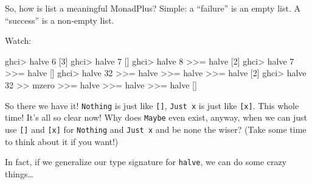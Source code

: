 \documentclass[]{article}
\newenvironment{Shaded}{}{}
\newcommand{\CommentTok}[1]{\textcolor[rgb]{0.38,0.63,0.69}{\textit{#1}}}
\newcommand{\DataTypeTok}[1]{\textcolor[rgb]{0.56,0.13,0.00}{#1}}
\newcommand{\DecValTok}[1]{\textcolor[rgb]{0.25,0.63,0.44}{#1}}
\newcommand{\FunctionTok}[1]{\textcolor[rgb]{0.02,0.16,0.49}{#1}}
\newcommand{\KeywordTok}[1]{\textcolor[rgb]{0.00,0.44,0.13}{\textbf{#1}}}
\newcommand{\NormalTok}[1]{#1}
\newcommand{\OperatorTok}[1]{\textcolor[rgb]{0.40,0.40,0.40}{#1}}
\newcommand{\OtherTok}[1]{\textcolor[rgb]{0.00,0.44,0.13}{#1}}
\begin{document}
So, how is list a meaningful MonadPlus? Simple: a ``failure'' is an empty list.
A ``success'' is a non-empty list.

Watch:

\begin{Shaded}
\begin{Highlighting}[]
\NormalTok{ghci}\OperatorTok{\textgreater{}}\NormalTok{ halve\textquotesingle{} }\DecValTok{6}
\NormalTok{[}\DecValTok{3}\NormalTok{]}
\NormalTok{ghci}\OperatorTok{\textgreater{}}\NormalTok{ halve\textquotesingle{} }\DecValTok{7}
\NormalTok{[]}
\NormalTok{ghci}\OperatorTok{\textgreater{}}\NormalTok{ halve\textquotesingle{} }\DecValTok{8} \OperatorTok{\textgreater{}\textgreater{}=}\NormalTok{ halve\textquotesingle{}}
\NormalTok{[}\DecValTok{2}\NormalTok{]}
\NormalTok{ghci}\OperatorTok{\textgreater{}}\NormalTok{ halve\textquotesingle{} }\DecValTok{7} \OperatorTok{\textgreater{}\textgreater{}=}\NormalTok{ halve\textquotesingle{}}
\NormalTok{[]}
\NormalTok{ghci}\OperatorTok{\textgreater{}}\NormalTok{ halve\textquotesingle{} }\DecValTok{32} \OperatorTok{\textgreater{}\textgreater{}=}\NormalTok{ halve\textquotesingle{} }\OperatorTok{\textgreater{}\textgreater{}=}\NormalTok{ halve\textquotesingle{} }\OperatorTok{\textgreater{}\textgreater{}=}\NormalTok{ halve\textquotesingle{}}
\NormalTok{[}\DecValTok{2}\NormalTok{]}
\NormalTok{ghci}\OperatorTok{\textgreater{}}\NormalTok{ halve\textquotesingle{} }\DecValTok{32} \OperatorTok{\textgreater{}\textgreater{}}\NormalTok{ mzero }\OperatorTok{\textgreater{}\textgreater{}=}\NormalTok{ halve\textquotesingle{} }\OperatorTok{\textgreater{}\textgreater{}=}\NormalTok{ halve\textquotesingle{} }\OperatorTok{\textgreater{}\textgreater{}=}\NormalTok{ halve\textquotesingle{}}
\NormalTok{[]}
\end{Highlighting}
\end{Shaded}

So there we have it! \texttt{Nothing} is just like \texttt{{[}{]}},
\texttt{Just\ x} is just like \texttt{{[}x{]}}. This whole time! It's all so
clear now! Why does \texttt{Maybe} even exist, anyway, when we can just use
\texttt{{[}{]}} and \texttt{{[}x{]}} for \texttt{Nothing} and \texttt{Just\ x}
and be none the wiser? (Take some time to think about it if you want!)

In fact, if we generalize our type signature for \texttt{halve}, we can do some
crazy things\ldots{}

\begin{Shaded}
\end{Shaded}
\end{document}
